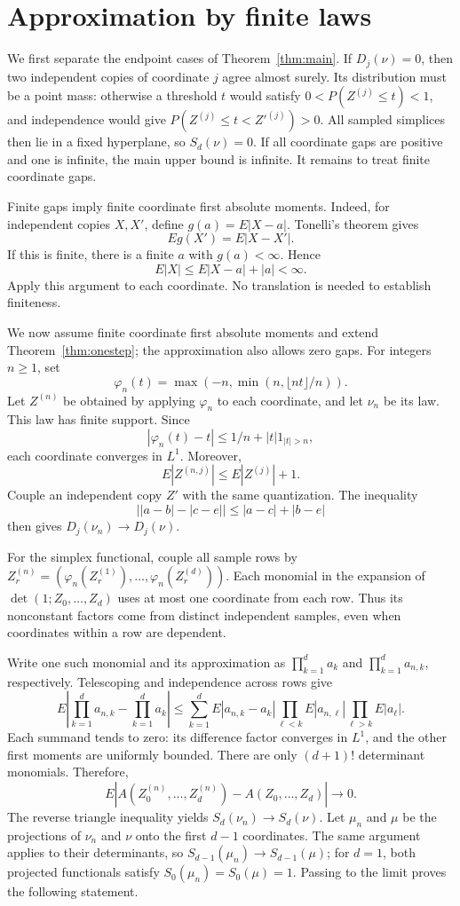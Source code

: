 \documentclass[11pt]{article}
\theoremstyle{remark}
\newcommand{\E}{E}
\newcommand{\one}{1}
\begin{document}
\section{Approximation by finite laws}
\label{sec:general}
\begin{aiblock}
We first separate the endpoint cases of Theorem~\ref{thm:main}. If
$D_j(\nu)=0$, then two independent copies of coordinate $j$ agree almost
surely. Its distribution must be a point mass: otherwise a threshold
$t$ would satisfy $0<P(Z^{(j)}\leq t)<1$, and independence would give
$P(Z^{(j)}\leq t<Z'^{(j)})>0$. All sampled simplices then lie in a fixed
hyperplane, so $S_d(\nu)=0$. If all coordinate gaps are positive and
one is infinite, the main upper bound is infinite. It remains to treat
finite coordinate gaps.

Finite gaps imply finite coordinate first absolute moments. Indeed, for
independent copies $X,X'$, define $g(a)=\E|X-a|$. Tonelli's theorem gives
$$\E g(X')=\E|X-X'|.$$
If this is finite, there is a finite $a$ with $g(a)<\infty$. Hence
$$\E|X|\leq\E|X-a|+|a|<\infty.$$
Apply this argument to each coordinate. No translation is needed to
establish finiteness.

We now assume finite coordinate first absolute moments and extend
Theorem~\ref{thm:onestep}; the approximation also allows zero gaps.
For integers $n\geq1$, set
$$\varphi_n(t)=\max(-n,\min(n,\lfloor nt\rfloor/n)).$$
Let $Z^{(n)}$ be obtained by applying $\varphi_n$ to each coordinate,
and let $\nu_n$ be its law. This law has finite support. Since
$$|\varphi_n(t)-t|\leq1/n+|t|\one_{|t|>n},$$
each coordinate converges in $L^1$. Moreover,
$$\E|Z^{(n,j)}|\leq\E|Z^{(j)}|+1.$$
Couple an independent copy $Z'$ with the same quantization. The inequality
$$\left||a-b|-|c-e|\right|\leq|a-c|+|b-e|$$
then gives $D_j(\nu_n)\to D_j(\nu)$.

For the simplex functional, couple all sample rows by
$Z_r^{(n)}=(\varphi_n(Z_r^{(1)}),\ldots,\varphi_n(Z_r^{(d)}))$.
Each monomial in the expansion of $\det(1;Z_0,\ldots,Z_d)$ uses at most
one coordinate from each row. Thus its nonconstant factors come from
distinct independent samples, even when coordinates within a row are
dependent.

Write one such monomial and its approximation as $\prod_{k=1}^d a_k$
and $\prod_{k=1}^d a_{n,k}$, respectively. Telescoping and independence
across rows give
$$\E\left|\prod_{k=1}^d a_{n,k}-\prod_{k=1}^d a_k\right|\leq\sum_{k=1}^d\E|a_{n,k}-a_k|\prod_{\ell<k}\E|a_{n,\ell}|\prod_{\ell>k}\E|a_\ell|.$$
Each summand tends to zero: its difference factor converges in $L^1$,
and the other first moments are uniformly bounded. There are only
$(d+1)!$ determinant monomials. Therefore,
\begin{equation}
\E|A(Z_0^{(n)},\ldots,Z_d^{(n)})-A(Z_0,\ldots,Z_d)|\longrightarrow0.
\end{equation}
The reverse triangle inequality yields $S_d(\nu_n)\to S_d(\nu)$.
Let $\mu_n$ and $\mu$ be the projections of $\nu_n$ and $\nu$ onto
the first $d-1$ coordinates. The same argument applies to their determinants,
so $S_{d-1}(\mu_n)\to S_{d-1}(\mu)$; for $d=1$, both projected functionals satisfy $S_0(\mu_n)=S_0(\mu)=1$. Passing to the limit proves the following statement.


\end{aiblock}
\end{document}

